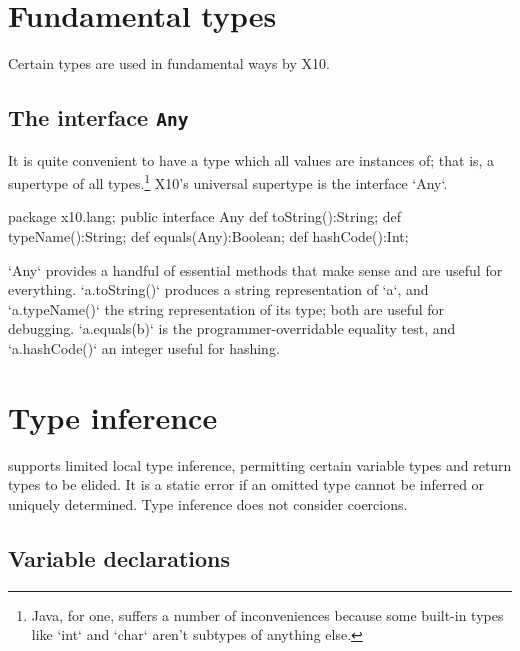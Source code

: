 
\section{Fundamental types}

Certain types are used in fundamental ways by X10.  

\subsection{The interface {\tt Any}}

It is quite convenient to have a type which all values are instances of; that
is, a supertype of all types.\footnote{Java, for one, suffers a number of
  inconveniences because some built-in types like \xcd`int` and \xcd`char`
  aren't subtypes of anything else.}  X10's universal supertype is the
  interface \xcd`Any`. 

\begin{xten}
package x10.lang;
public interface Any {
  def toString():String;
  def typeName():String;
  def equals(Any):Boolean;
  def hashCode():Int;
}
\end{xten}

\xcd`Any` provides a handful of essential methods that make sense and are
useful for everything. \xcd`a.toString()` produces a
string representation of \xcd`a`, and \xcd`a.typeName()` the string
representation of its type; both are useful for debugging.  \xcd`a.equals(b)`
is the programmer-overridable equality test, and \xcd`a.hashCode()` an integer
useful for hashing.  

\section{Type inference}
\label{TypeInference}

\XtenCurrVer{} supports limited local type inference, permitting
certain variable types and return types to be elided.
It is a static error if an omitted type cannot be inferred or
uniquely determined. Type inference does not consider coercions.

\subsection{Variable declarations}

